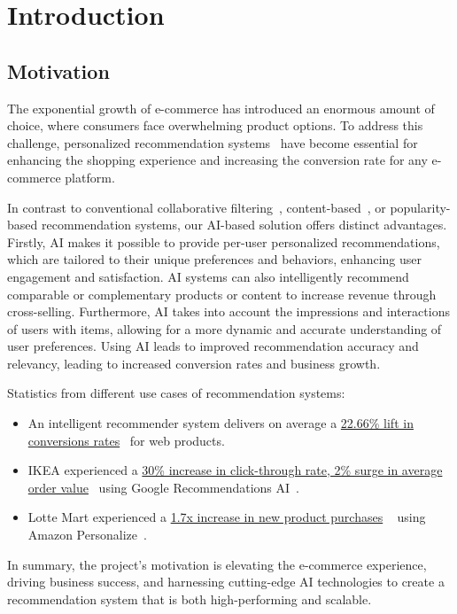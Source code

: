 \chapter{Introduction}
\minitoc

\section{Motivation}

The exponential growth of e-commerce has introduced an enormous amount of choice, where consumers face overwhelming product options. To address this challenge, personalized recommendation systems~\cite{raghavendra2018personalized} have become essential for enhancing the shopping experience and increasing the conversion rate for any e-commerce platform.

In contrast to conventional collaborative filtering~\cite{NvidiaRecSys}, content-based~\cite{pazzani2007content}, or popularity-based recommendation systems, our AI-based solution offers distinct advantages. Firstly, AI makes it possible to provide per-user personalized recommendations, which are tailored to their unique preferences and behaviors, enhancing user engagement and satisfaction. AI systems can also intelligently recommend comparable or complementary products or content to increase revenue through cross-selling. Furthermore, AI takes into account the impressions and interactions of users with items, allowing for a more dynamic and accurate understanding of user preferences. Using AI leads to improved recommendation accuracy and relevancy, leading to increased conversion rates and business growth.
    




Statistics from different use cases of recommendation systems:
\begin{itemize}[left=0in]
    \item An intelligent recommender system delivers on average a
    \underline{22.66\% lift in conversions rates}~\cite{salesforce2014predictive} for web products.
    
    \item IKEA experienced a \underline{30\% increase in click-through rate, 2\% surge in average order value}~\cite{IkeaRecAtGoogleCloudSummit} using Google Recommendations AI~\cite{GoogleRecommendationsAI}.
    
    \item Lotte Mart experienced a
    \underline{1.7x increase in new product purchases} ~\cite{LotteMartAwsPersonalize} using Amazon Personalize~\cite{AWSPersonalize}.
\end{itemize}
In summary, the project's motivation is elevating the e-commerce experience, driving business success, and harnessing cutting-edge AI technologies to create a recommendation system that is both high-performing and scalable.

